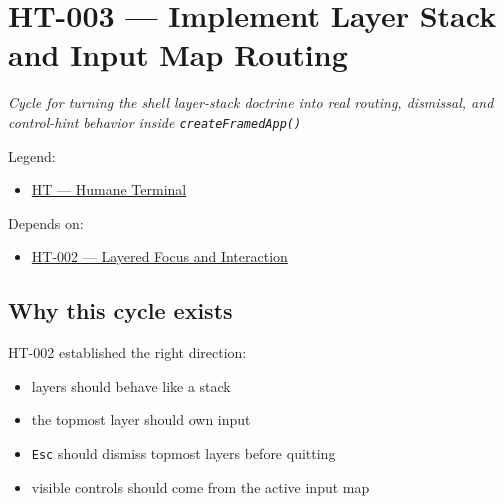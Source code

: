 \chapter{HT-003 --- Implement Layer Stack and Input Map Routing}\label{record-255}

\smallskip

\emph{Cycle for turning the shell layer-stack doctrine into real routing, dismissal, and control-hint behavior inside \texttt{c\allowbreak{}r\allowbreak{}e\allowbreak{}a\allowbreak{}t\allowbreak{}e\allowbreak{}F\allowbreak{}r\allowbreak{}a\allowbreak{}m\allowbreak{}e\allowbreak{}d\allowbreak{}A\allowbreak{}p\allowbreak{}p\allowbreak{}(\allowbreak{})}}

Legend:

\begin{itemize}
\tightlist
\item
  \href{https://github.com/flyingrobots/bijou/blob/1853ad902f6bf219326409e7f743a5a1d6517dbc/docs/legends/HT-humane-terminal.md}{HT --- Humane Terminal}
\end{itemize}

Depends on:

\begin{itemize}
\tightlist
\item
  \href{https://github.com/flyingrobots/bijou/blob/cbd70612140e7a450d764b3c7be1c6af878b99bc/docs/design/HT-002-layered-focus-and-interaction.md}{HT-002 --- Layered Focus and Interaction}
\end{itemize}

\section{Why this cycle exists}\label{record-255-why-this-cycle-exists}

HT-002 established the right direction:

\begin{itemize}
\tightlist
\item
  layers should behave like a stack
\item
  the topmost layer should own input
\item
  \texttt{E\allowbreak{}s\allowbreak{}c} should dismiss topmost layers before quitting
\item
  visible controls should come from the active input map
\end{itemize}

